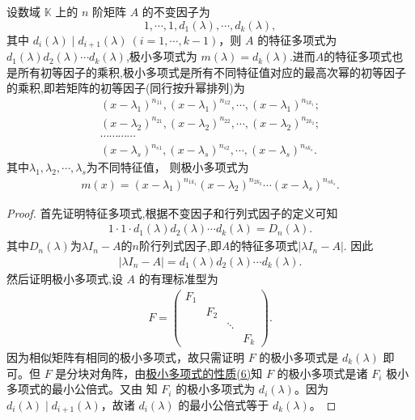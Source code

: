 \documentclass[../../main.tex]{subfiles}
\begin{document}
\begin{theorem}[极小多项式就是幂次最大的不变因子]\label{theorem:极小多项式与不变因子的关系}
设数域 $\mathbb{K}$ 上的 $n$ 阶矩阵 $A$ 的不变因子为
\[
1,\cdots,1,d_1(\lambda),\cdots,d_k(\lambda),
\]
其中 $d_i(\lambda)\mid d_{i + 1}(\lambda)\ (i = 1,\cdots,k - 1)$，则 $A$ 的特征多项式为$d_1(\lambda)d_2(\lambda)\cdots d_k(\lambda)$,极小多项式为 $m(\lambda)=d_k(\lambda)$.进而$A$的特征多项式也是所有初等因子的乘积,极小多项式是所有不同特征值对应的最高次幂的初等因子的乘积,即若矩阵的初等因子(同行按升幂排列)为
\begin{gather*}
(x-\lambda _1)^{n_{11}},(x-\lambda _1)^{n_{12}},\cdots ,(x-\lambda _1)^{n_{1k_1}}; 
\\
(x-\lambda _2)^{n_{21}},(x-\lambda _2)^{n_{22}},\cdots ,(x-\lambda _2)^{n_{2k_2}}; 
\\
\cdots \cdots \cdots \cdots 
\\
(x-\lambda _s)^{n_{s1}},(x-\lambda _s)^{n_{s2}},\cdots ,(x-\lambda _s)^{n_{sk_s}}.
\end{gather*}
其中\(\lambda_1,\lambda_2,\cdots,\lambda_s\)为不同特征值，
则极小多项式为
\begin{align*}
m(x)=(x-\lambda _1)^{n_{1k_1}}(x-\lambda _2)^{n_{2k_2}}\cdots (x-\lambda _s)^{n_{sk_s}}.
\end{align*}
\end{theorem}
\begin{proof}
首先证明特征多项式,根据不变因子和行列式因子的定义可知
\begin{align*}
1\cdot 1\cdot d_1(\lambda)d_2(\lambda)\cdots d_k(\lambda)=D_n(\lambda).
\end{align*}
其中$D_n(\lambda)$为$\lambda I_n-A$的$n$阶行列式因子,即$A$的特征多项式$|\lambda I_n-A|$.
因此
\begin{align*}
|\lambda I_n-A|=d_1(\lambda)d_2(\lambda)\cdots d_k(\lambda).
\end{align*}
然后证明极小多项式,设 $A$ 的有理标准型为
\begin{align*}
F = \begin{pmatrix}
F_1 & & & \\
& F_2 & & \\
& & \ddots & \\
& & & F_k
\end{pmatrix}.
\end{align*}
因为相似矩阵有相同的极小多项式，故只需证明 $F$ 的极小多项式是 $d_k(\lambda)$ 即可。但 $F$ 是分块对角阵，由\hyperref[proposition:极小多项式的性质]{极小多项式的性质(6)}知 $F$ 的极小多项式是诸 $F_i$ 极小多项式的最小公倍式。又由 知 $F_i$ 的极小多项式为 $d_i(\lambda)$。因为 $d_i(\lambda)\mid d_{i + 1}(\lambda)$，故诸 $d_i(\lambda)$ 的最小公倍式等于 $d_k(\lambda)$。
\end{proof}
\end{document}
